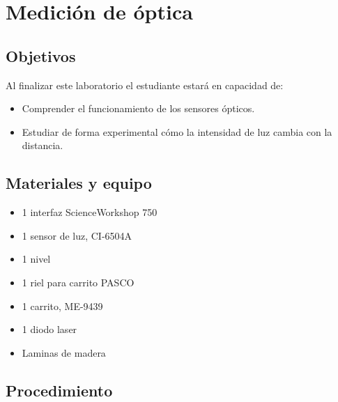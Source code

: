 \documentclass[12pt,letterpaper]{report}
\newcommand{\obj}{Objetivos}
\newcommand{\mat}{Materiales y equipo}
\newcommand{\pro}{Procedimiento}
\newcommand{\capacidad}{Al finalizar este laboratorio el estudiante estará en capacidad de:}
\begin{document}
\chapter{Medición de óptica}
\section{\obj}
\capacidad
\begin{itemize}
\item Comprender el funcionamiento de los sensores ópticos. 
\item Estudiar de forma experimental cómo la intensidad de luz cambia con la distancia.
\end{itemize}

\section{\mat}
\begin{itemize}
\item 1 interfaz ScienceWorkshop\,\textregistered\,750
\item 1 sensor de luz, CI-6504A
\item 1 nivel
\item 1 riel para carrito PASCO
\item 1 carrito, ME-9439
\item 1 diodo laser
\item Laminas de madera
\end{itemize}


\section{\pro}
\end{document}

